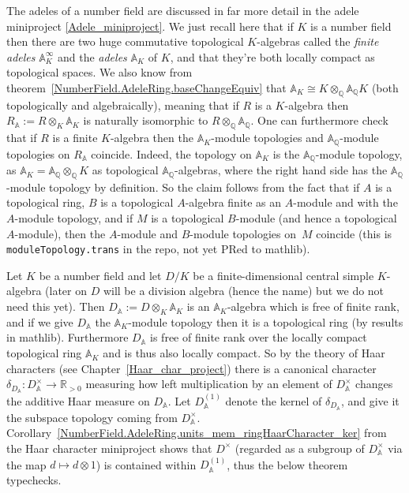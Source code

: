 \documentclass[10pt,a4paper]{article}
\newcommand{\A}{\mathbb{A}}
\newcommand{\Q}{\mathbb{Q}}
\newcommand{\R}{\mathbb{R}}
\begin{document}
The adeles of a number field are discussed in far more detail
in the adele miniproject \ref{Adele_miniproject}. We just recall here that if $K$ is a number field
then there are two huge commutative topological $K$-algebras called the \emph{finite adeles}
$\A_K^\infty$ and the \emph{adeles} $\A_K$ of $K$, and that they're both locally compact
as topological spaces. We also know from theorem~\ref{NumberField.AdeleRing.baseChangeEquiv}
that $\A_K\cong K\otimes_{\Q}\A_{\Q}K$ (both topologically and algebraically), meaning
that if $R$ is a $K$-algebra then $R_{\A} := R\otimes_K\A_K$ is naturally isomorphic
to $R\otimes_{\Q}\A_{\Q}$. One can
furthermore check that if $R$ is a finite $K$-algebra then the $\A_K$-module topologies and $\A_{\Q}$-module
topologies on $R_{\A}$ coincide. Indeed, the topology on $\A_K$
is the $\A_{\Q}$-module topology, as
$\A_K=\A_{\Q}\otimes_{\Q}K$ as topological $\A_{\Q}$-algebras, where the right hand side
has the $\A_{\Q}$-module topology by definition. So the claim follows from the
fact that if $A$ is a topological ring, $B$ is a topological $A$-algebra
finite as an $A$-module and with the $A$-module topology, and if
$M$ is a topological $B$-module
(and hence a topological $A$-module), then the $A$-module and $B$-module
topologies on~$M$ coincide (this is {\tt moduleTopology.trans} in the repo,
not yet PRed to mathlib).

Let $K$ be a number field and let $D/K$ be a finite-dimensional central simple $K$-algebra
(later on $D$ will be a division algebra (hence the name) but we do not need this yet).
Then $D_{\A}:=D\otimes_K\A_K$ is an $\A_K$-algebra which
is free of finite rank, and if we give $D_{\A}$ the $\A_K$-module topology then it is
a topological ring (by results in mathlib). Furthermore $D_{\A}$ is free of finite
rank over the locally compact topological ring $\A_K$ and is thus also
locally compact. So by the theory of Haar characters (see Chapter~\ref{Haar_char_project})
there is a canonical character $\delta_{D_{\A}}:D_{\A}^\times\to\R_{>0}$ measuring
how left multiplication by an element of $D_{\A}^\times$ changes the additive Haar
measure on $D_{\A}$. Let $D_{\A}^{(1)}$ denote the kernel of $\delta_{D_{\A}}$,
and give it the subspace topology coming from $D_{\A}^\times$.
Corollary~\ref{NumberField.AdeleRing.units_mem_ringHaarCharacter_ker} from the
Haar character miniproject shows that $D^\times$ (regarded as a subgroup of $D_{\A}^\times$
via the map $d\mapsto d\otimes 1$) is contained within $D_{\A}^{(1)}$,
thus the below theorem typechecks.
\end{document}
